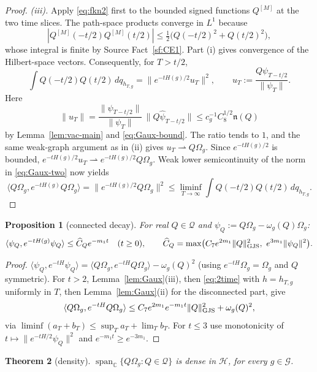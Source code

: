 \documentclass[11pt,a4paper]{article}
\theoremstyle{plain}
\newtheorem{theorem}{Theorem}[section]
\newtheorem{proposition}[theorem]{Proposition}
\theoremstyle{definition}
\newcommand{\G}{\mathcal{G}}
\newcommand{\Q}{\mathcal{Q}}
\newcommand{\HH}{\mathcal{H}}
\newcommand{\Om}{\Omega}
\newcommand{\ip}[2]{\langle #1,#2\rangle}
\DeclareMathOperator{\Span}{span}
\begin{document}
\begin{proof}
\emph{(iii).} Apply \eqref{eq:fkn2} first to the bounded signed functions $Q^{[M]}$ at the
two time slices. The path-space products converge in $L^1$ because
\[
 |Q^{[M]}(-t/2)Q^{[M]}(t/2)|
 \le\tfrac12\bigl(Q(-t/2)^2+Q(t/2)^2\bigr),
\]
whose integral is finite by Source Fact~\ref{sf:CE1}. Part (i) gives convergence of the
Hilbert-space vectors. Consequently, for $T>t/2$,
\begin{equation}\label{eq:Gaux-two}
 \int Q(-t/2)Q(t/2)\,dq_{h_{T,g}}
 =\|e^{-tH(g)/2}u_T\|^2,\qquad
 u_T:=\frac{Q\psi_{T-t/2}}{\|\psi_T\|}.
\end{equation}
Here
\[
 \|u_T\|
 =\frac{\|\psi_{T-t/2}\|}{\|\psi_T\|}\,
   \|Q\hat\psi_{T-t/2}\|
 \le c_g^{-1}C_8^{1/2}\mathfrak n(Q)
\]
by Lemma~\ref{lem:vac-main} and \eqref{eq:Gaux-bound}. The ratio tends to $1$, and the same weak-graph
argument as in (ii) gives $u_T\rightharpoonup Q\Om_g$. Since $e^{-tH(g)/2}$ is bounded,
$e^{-tH(g)/2}u_T\rightharpoonup e^{-tH(g)/2}Q\Om_g$. Weak lower semicontinuity of the norm
in \eqref{eq:Gaux-two} now yields
\[
 \ip{Q\Om_g}{e^{-tH(g)}Q\Om_g}
 =\|e^{-tH(g)/2}Q\Om_g\|^2
 \le\liminf_{T\to\infty}\int Q(-t/2)Q(t/2)\,dq_{h_{T,g}}.
\]
\end{proof}

\begin{proposition}[connected decay]\label{prop:decay-main}
For real $Q\in\Q$ and $\psi_Q:=Q\Om_g-\omega_g(Q)\Om_g$:
\[
  \ip{\psi_Q}{e^{-tH(g)}\psi_Q}\le\widehat C_Qe^{-m_1t}\quad(t\ge0),\qquad
  \widehat C_Q=\max\bigl(C_7e^{2m_1}\|Q\|_{\rm GJS}^2,\ e^{3m_1}\|\psi_Q\|^2\bigr).
\]
\end{proposition}

\begin{proof}
$\ip{\psi_Q}{e^{-tH}\psi_Q}=\ip{Q\Om_g}{e^{-tH}Q\Om_g}-\omega_g(Q)^2$ (using
$e^{-tH}\Om_g=\Om_g$ and $Q$ symmetric). For $t>2$, Lemma~\ref{lem:Gaux}(iii), then
\eqref{eq:2time} with $h=h_{T,g}$ uniformly in $T$, then Lemma~\ref{lem:Gaux}(ii) for the
disconnected part, give
\[
  \ip{Q\Om_g}{e^{-tH}Q\Om_g}\le C_7e^{2m_1}e^{-m_1t}\|Q\|_{\rm GJS}^2+\omega_g(Q)^2 ,
\]
via $\liminf(a_T+b_T)\le\sup_Ta_T+\lim_Tb_T$. For $t\le3$ use monotonicity of
$t\mapsto\|e^{-tH/2}\psi_Q\|^2$ and $e^{-m_1t}\ge e^{-3m_1}$.
\end{proof}

\begin{theorem}[density]\label{thm:dense-main}
$\Span_{\mathbb C}\{Q\Om_g:Q\in\Q\}$ is dense in $\HH$, for every $g\in\G$.
\end{theorem}
\end{document}
